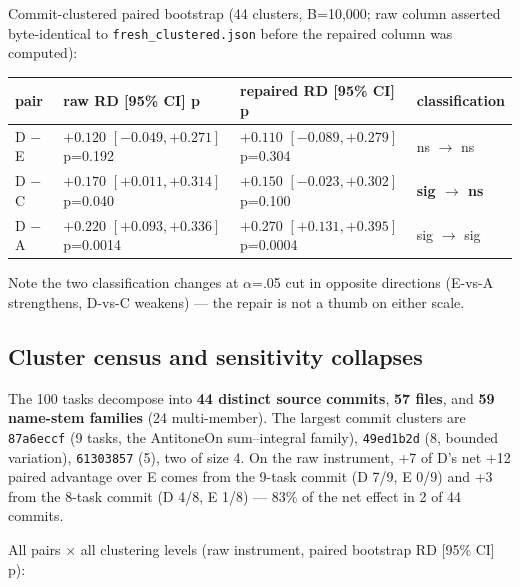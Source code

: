 \documentclass[10pt]{article}
\newcommand{\code}[1]{\texttt{#1}}
\newcommand{\best}[1]{\textbf{#1}}
\begin{document}
Commit-clustered paired bootstrap (44 clusters, B=10,000; raw column
asserted byte-identical to \code{fresh\_clustered.json} before the
repaired column was computed):

\begin{center}\footnotesize
\begin{tabular}{@{}llll@{}}
\toprule
pair & raw RD [95\% CI] p & repaired RD [95\% CI] p & classification \\
\midrule
D $-$ E & $+0.120$ $[-0.049, +0.271]$ p=0.192 & $+0.110$ $[-0.089, +0.279]$ p=0.304 & ns $\to$ ns \\
D $-$ C & $+0.170$ $[+0.011, +0.314]$ p=0.040 & $+0.150$ $[-0.023, +0.302]$ p=0.100 & \best{sig $\to$ ns} \\
D $-$ A & $+0.220$ $[+0.093, +0.336]$ p=0.0014 & $+0.270$ $[+0.131, +0.395]$ p=0.0004 & sig $\to$ sig \\
\bottomrule
\end{tabular}
\end{center}

Note the two classification changes at $\alpha$=.05 cut in opposite
directions (E-vs-A strengthens, D-vs-C weakens) --- the repair is not a
thumb on either scale.

\subsection{Cluster census and sensitivity collapses}\label{s2:cluster}

The 100 tasks decompose into \textbf{44 distinct source commits},
\textbf{57 files}, and \textbf{59 name-stem families} (24
multi-member). The largest commit clusters are \code{87a6eccf} (9
tasks, the AntitoneOn sum--integral family), \code{49ed1b2d} (8,
bounded variation), \code{61303857} (5), two of size 4. On the raw
instrument, +7 of D's net +12 paired advantage over E comes from the
9-task commit (D 7/9, E 0/9) and +3 from the 8-task commit (D 4/8,
E 1/8) --- 83\% of the net effect in 2 of 44 commits.

All pairs $\times$ all clustering levels (raw instrument, paired
bootstrap RD [95\% CI] p):

\begin{center}
\end{center}
\end{document}
